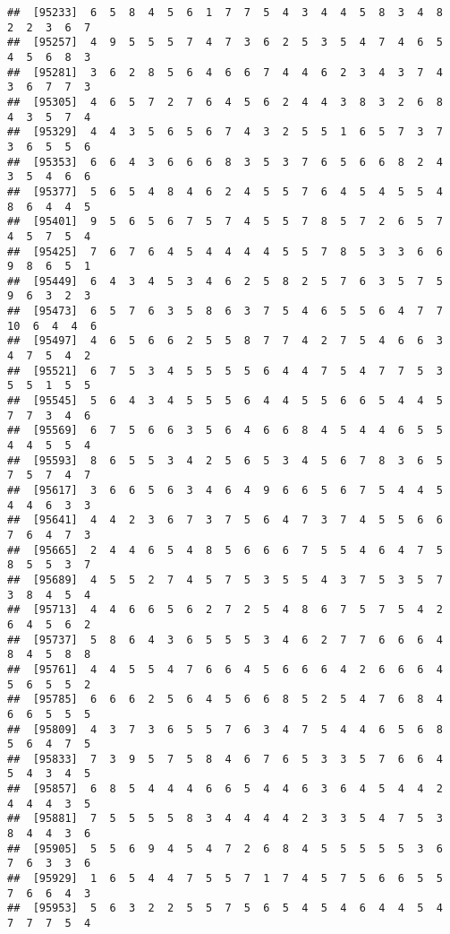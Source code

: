 \documentclass[
]{book}
\begin{document}
\begin{verbatim}
##  [95233]  6  5  8  4  5  6  1  7  7  5  4  3  4  4  5  8  3  4  8  2  2  3  6  7
##  [95257]  4  9  5  5  5  7  4  7  3  6  2  5  3  5  4  7  4  6  5  4  5  6  8  3
##  [95281]  3  6  2  8  5  6  4  6  6  7  4  4  6  2  3  4  3  7  4  3  6  7  7  3
##  [95305]  4  6  5  7  2  7  6  4  5  6  2  4  4  3  8  3  2  6  8  4  3  5  7  4
##  [95329]  4  4  3  5  6  5  6  7  4  3  2  5  5  1  6  5  7  3  7  3  6  5  5  6
##  [95353]  6  6  4  3  6  6  6  8  3  5  3  7  6  5  6  6  8  2  4  3  5  4  6  6
##  [95377]  5  6  5  4  8  4  6  2  4  5  5  7  6  4  5  4  5  5  4  8  6  4  4  5
##  [95401]  9  5  6  5  6  7  5  7  4  5  5  7  8  5  7  2  6  5  7  4  5  7  5  4
##  [95425]  7  6  7  6  4  5  4  4  4  4  5  5  7  8  5  3  3  6  6  9  8  6  5  1
##  [95449]  6  4  3  4  5  3  4  6  2  5  8  2  5  7  6  3  5  7  5  9  6  3  2  3
##  [95473]  6  5  7  6  3  5  8  6  3  7  5  4  6  5  5  6  4  7  7 10  6  4  4  6
##  [95497]  4  6  5  6  6  2  5  5  8  7  7  4  2  7  5  4  6  6  3  4  7  5  4  2
##  [95521]  6  7  5  3  4  5  5  5  5  6  4  4  7  5  4  7  7  5  3  5  5  1  5  5
##  [95545]  5  6  4  3  4  5  5  5  6  4  4  5  5  6  6  5  4  4  5  7  7  3  4  6
##  [95569]  6  7  5  6  6  3  5  6  4  6  6  8  4  5  4  4  6  5  5  4  4  5  5  4
##  [95593]  8  6  5  5  3  4  2  5  6  5  3  4  5  6  7  8  3  6  5  7  5  7  4  7
##  [95617]  3  6  6  5  6  3  4  6  4  9  6  6  5  6  7  5  4  4  5  4  4  6  3  3
##  [95641]  4  4  2  3  6  7  3  7  5  6  4  7  3  7  4  5  5  6  6  7  6  4  7  3
##  [95665]  2  4  4  6  5  4  8  5  6  6  6  7  5  5  4  6  4  7  5  8  5  5  3  7
##  [95689]  4  5  5  2  7  4  5  7  5  3  5  5  4  3  7  5  3  5  7  3  8  4  5  4
##  [95713]  4  4  6  6  5  6  2  7  2  5  4  8  6  7  5  7  5  4  2  6  4  5  6  2
##  [95737]  5  8  6  4  3  6  5  5  5  3  4  6  2  7  7  6  6  6  4  8  4  5  8  8
##  [95761]  4  4  5  5  4  7  6  6  4  5  6  6  6  4  2  6  6  6  4  5  6  5  5  2
##  [95785]  6  6  6  2  5  6  4  5  6  6  8  5  2  5  4  7  6  8  4  6  6  5  5  5
##  [95809]  4  3  7  3  6  5  5  7  6  3  4  7  5  4  4  6  5  6  8  5  6  4  7  5
##  [95833]  7  3  9  5  7  5  8  4  6  7  6  5  3  3  5  7  6  6  4  5  4  3  4  5
##  [95857]  6  8  5  4  4  4  6  6  5  4  4  6  3  6  4  5  4  4  2  4  4  4  3  5
##  [95881]  7  5  5  5  5  8  3  4  4  4  4  2  3  3  5  4  7  5  3  8  4  4  3  6
##  [95905]  5  5  6  9  4  5  4  7  2  6  8  4  5  5  5  5  5  3  6  7  6  3  3  6
##  [95929]  1  6  5  4  4  7  5  5  7  1  7  4  5  7  5  6  6  5  5  7  6  6  4  3
##  [95953]  5  6  3  2  2  5  5  7  5  6  5  4  5  4  6  4  4  5  4  7  7  7  5  4

\end{verbatim}
\end{document}
